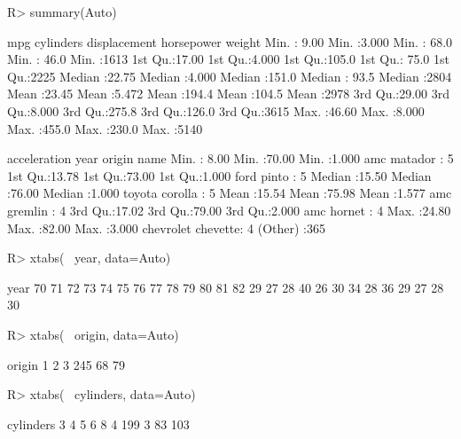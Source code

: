\documentclass[
]{jss}
\begin{document}
\begin{CodeChunk}
\begin{CodeInput}
R> summary(Auto)
\end{CodeInput}
\begin{CodeOutput}
      mpg          cylinders      displacement     horsepower        weight    
 Min.   : 9.00   Min.   :3.000   Min.   : 68.0   Min.   : 46.0   Min.   :1613  
 1st Qu.:17.00   1st Qu.:4.000   1st Qu.:105.0   1st Qu.: 75.0   1st Qu.:2225  
 Median :22.75   Median :4.000   Median :151.0   Median : 93.5   Median :2804  
 Mean   :23.45   Mean   :5.472   Mean   :194.4   Mean   :104.5   Mean   :2978  
 3rd Qu.:29.00   3rd Qu.:8.000   3rd Qu.:275.8   3rd Qu.:126.0   3rd Qu.:3615  
 Max.   :46.60   Max.   :8.000   Max.   :455.0   Max.   :230.0   Max.   :5140  
                                                                               
  acceleration        year           origin                      name    
 Min.   : 8.00   Min.   :70.00   Min.   :1.000   amc matador       :  5  
 1st Qu.:13.78   1st Qu.:73.00   1st Qu.:1.000   ford pinto        :  5  
 Median :15.50   Median :76.00   Median :1.000   toyota corolla    :  5  
 Mean   :15.54   Mean   :75.98   Mean   :1.577   amc gremlin       :  4  
 3rd Qu.:17.02   3rd Qu.:79.00   3rd Qu.:2.000   amc hornet        :  4  
 Max.   :24.80   Max.   :82.00   Max.   :3.000   chevrolet chevette:  4  
                                                 (Other)           :365  
\end{CodeOutput}
\begin{CodeInput}
R> xtabs(~ year, data=Auto)
\end{CodeInput}
\begin{CodeOutput}
year
70 71 72 73 74 75 76 77 78 79 80 81 82 
29 27 28 40 26 30 34 28 36 29 27 28 30 
\end{CodeOutput}
\begin{CodeInput}
R> xtabs(~ origin, data=Auto)
\end{CodeInput}
\begin{CodeOutput}
origin
  1   2   3 
245  68  79 
\end{CodeOutput}
\begin{CodeInput}
R> xtabs(~ cylinders, data=Auto)
\end{CodeInput}
\begin{CodeOutput}
cylinders
  3   4   5   6   8 
  4 199   3  83 103 
\end{CodeOutput}
\end{CodeChunk}
\end{document}
